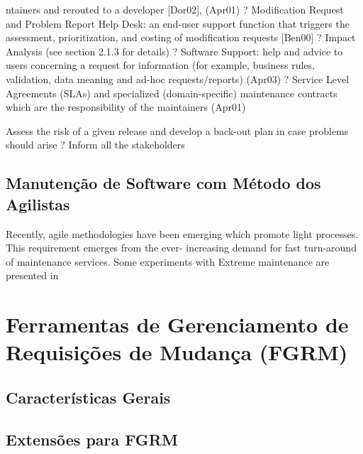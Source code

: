 ntainers and rerouted to a developer
[Dor02],
(Apr01)
? Modification Request and Problem Report Help Desk: an end-user support function that triggers the
assessment, prioritization, and costing
of
modification requests [Ben00]
? Impact Analysis (see section 2.1.3 for details) ? Software Support: help
and advice to users
concerning a request for information (for example, business rules, validation, data meaning and
ad-hoc requests/reports) (Apr03)
? Service Level Agreements (SLAs) and specialized (domain-specific) maintenance contracts which are
the responsibility of the maintainers (Apr01)


Assess the risk of a given release and develop a back-out plan in case problems should arise
? Inform all the stakeholders

\subsection{Manutenção de Software com Método dos Agilistas}
\label{sub:manutenção_de_software_com_método_dos_agilistas}

Recently, agile methodologies have been emerging which promote light processes. This requirement
emerges from the ever- increasing demand for
fast turn-around of maintenance
services. Some experiments with Extreme maintenance are presented in

\section{Ferramentas de Gerenciamento de Requisições de Mudança (FGRM)}
\label{sec:ferramentas_de_gerenciameto_de_requisições_de_mudança}

\subsection{Características Gerais}
\label{subsec:caracteristicas_gerais}

\subsection{Extensões para FGRM}
\label{subsec:extensoes_para_fgrm}







